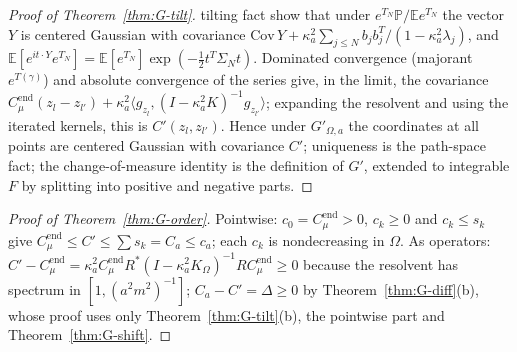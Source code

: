 \documentclass[11pt]{article}
\theoremstyle{plain}
\theoremstyle{definition}
\theoremstyle{remark}
\newcommand{\E}{\mathbb{E}}
\newcommand{\PP}{\mathbb{P}}
\newcommand{\Cend}{C^{\mathrm{end}}_{\mu}}
\begin{document}
\begin{proof}[Proof of Theorem~\ref{thm:G-tilt}]
tilting fact show that under $e^{T_N}\PP/\E e^{T_N}$ the vector $Y$ is centered Gaussian with
covariance $\mathrm{Cov}\,Y+\kappa_a^{2}\sum_{j\le N}b_jb_j^{T}/(1-\kappa_a^{2}\lambda_j)$, and
$\E[e^{it\cdot Y}e^{T_N}]=\E[e^{T_N}]\exp(-\tfrac12t^{T}\Sigma_Nt)$. Dominated convergence (majorant
$e^{T(\gamma)}$) and absolute convergence of the series give, in the limit, the covariance
$\Cend(z_l-z_{l'})+\kappa_a^{2}\langle g_{z_l},(I-\kappa_a^{2}K)^{-1}g_{z_{l'}}\rangle$; expanding the resolvent and using
the iterated kernels, this is $C'(z_l,z_{l'})$. Hence under $G'_{\Omega,a}$ the coordinates at
all points are centered Gaussian with covariance $C'$; uniqueness is the
path-space fact; the change-of-measure identity is the definition of $G'$,
extended to integrable $F$ by splitting into positive and negative parts.
\end{proof}

\begin{proof}[Proof of Theorem~\ref{thm:G-order}]
Pointwise: $c_0=\Cend>0$, $c_k\ge0$ and $c_k\le s_k$ give $\Cend\le C'\le\sum s_k=C_a\le c_a$; each $c_k$ is
nondecreasing in $\Omega$. As operators: $C'-\Cend=\kappa_a^{2}\Cend R^{*}(I-\kappa_a^{2}K_\Omega)^{-1}R\Cend\ge0$ because the
resolvent has spectrum in $[1,(a^{2}m^{2})^{-1}]$; $C_a-C'=\Delta\ge0$ by
Theorem~\ref{thm:G-diff}(b), whose proof uses only Theorem~\ref{thm:G-tilt}(b), the
pointwise part and Theorem~\ref{thm:G-shift}.
\end{proof}
\end{document}
